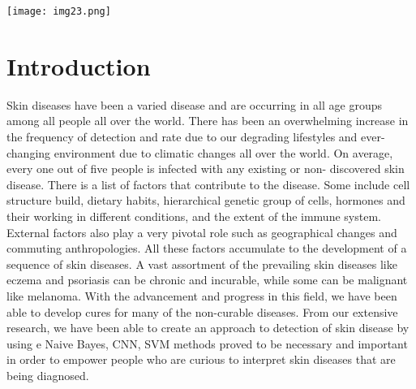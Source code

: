 \documentclass{article}
\begin{document}
\begin{center}
    \texttt{[image: img23.png]}
\end{center}

\section{Introduction}
Skin diseases have been a varied disease and are occurring in all age groups among all people all over the world. There has been an overwhelming increase in the frequency of detection and rate due to our degrading lifestyles and ever-changing environment due to climatic changes all over the world.
On average, every one out of five people is infected with any existing or non- discovered skin disease. There is a list of factors that contribute to the disease. Some include cell structure build, dietary habits, hierarchical genetic group of cells, hormones and their working in different conditions, and the extent of the immune system. External factors also play a very pivotal role such as geographical changes and commuting anthropologies.
All these factors accumulate to the development of a sequence of skin diseases.
A vast assortment of the prevailing skin diseases like eczema and psoriasis can be chronic and incurable, while some can be malignant like melanoma.
With the advancement and progress in this field, we have been able to develop cures for many of the non-curable diseases.
From our extensive research, we have been able to create an approach to detection of skin disease by using e Naive Bayes, CNN, SVM methods proved to be necessary and important in order to empower people who are curious to interpret skin diseases that are being diagnosed.
\end{document}
